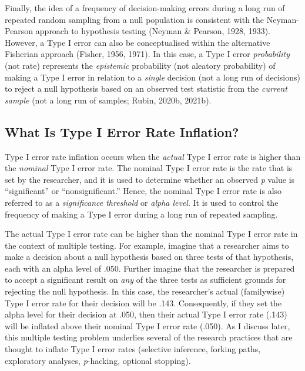 \documentclass[authordate, empirical]{jote-new-article}
\begin{document}
	Finally, the idea of a frequency of decision-making errors during a long run of repeated random sampling from a null population is consistent with the Neyman-Pearson approach to hypothesis testing (Neyman \& Pearson, 1928, 1933). However, a Type I error can also be conceptualised within the alternative Fisherian approach (Fisher, 1956, 1971). In this case, a Type I error \emph{probability} (not rate) represents the \emph{epistemic} probability (not aleatory probability) of making a Type I error in relation to a \emph{single} decision (not a long run of decisions) to reject a null hypothesis based on an observed test statistic from the \emph{current sample} (not a long run of samples; Rubin, 2020b, 2021b).







	\subsection{What Is Type I Error Rate Inflation?}



	Type I error rate inflation occurs when the \emph{actual} Type I error rate is higher than the \emph{nominal} Type I error rate. The nominal Type I error rate is the rate that is set by the researcher, and it is used to determine whether an observed \emph{p} value is “significant” or “nonsignificant.” Hence, the nominal Type I error rate is also referred to as a \emph{significance threshold} or \emph{alpha level}. It is used to control the frequency of making a Type I error during a long run of repeated sampling.



	The actual Type I error rate can be higher than the nominal Type I error rate in the context of multiple testing. For example, imagine that a researcher aims to make a decision about a null hypothesis based on three tests of that hypothesis, each with an alpha level of .050. Further imagine that the researcher is prepared to accept a significant result on \emph{any} of the three tests as sufficient grounds for rejecting the null hypothesis. In this case, the researcher's actual (familywise) Type I error rate for their decision will be .143. Consequently, if they set the alpha level for their decision at .050, then their actual Type I error rate (.143) will be inflated above their nominal Type I error rate (.050). As I discuss later, this multiple testing problem underlies several of the research practices that are thought to inflate Type I error rates (selective inference, forking paths, exploratory analyses, \emph{p}-hacking, optional stopping).
\end{document}
